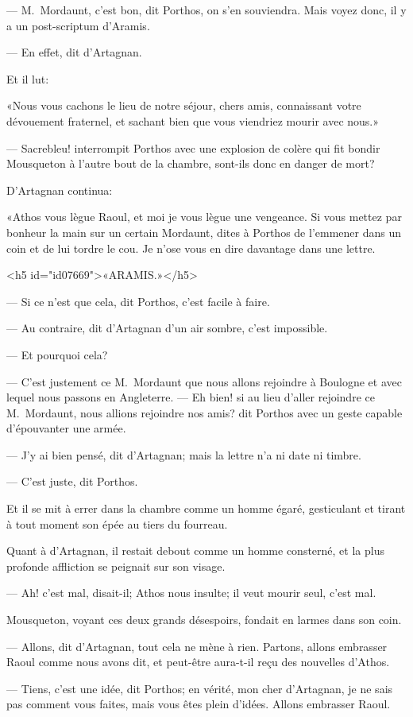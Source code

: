 — M.~Mordaunt, c'est bon, dit Porthos, on s'en souviendra. Mais voyez donc, il y a un post-scriptum d'Aramis.

— En effet, dit d'Artagnan.

Et il lut:

«Nous vous cachons le lieu de notre séjour, chers amis, connaissant votre dévouement fraternel, et sachant bien que vous viendriez mourir avec nous.»

— Sacrebleu! interrompit Porthos avec une explosion de colère qui fit bondir Mousqueton à l'autre bout de la chambre, sont-ils donc en danger de mort?

D'Artagnan continua:

«Athos vous lègue Raoul, et moi je vous lègue une vengeance. Si vous mettez par bonheur la main sur un certain Mordaunt, dites à Porthos de l'emmener dans un coin et de lui tordre le cou. Je n'ose vous en dire davantage dans une lettre.

<h5 id="id07669">«ARAMIS.»</h5>

— Si ce n'est que cela, dit Porthos, c'est facile à faire.

— Au contraire, dit d'Artagnan d'un air sombre, c'est impossible.

— Et pourquoi cela?

— C'est justement ce M.~Mordaunt que nous allons rejoindre à Boulogne et avec lequel nous passons en Angleterre.
— Eh bien! si au lieu d'aller rejoindre ce M.~Mordaunt, nous allions rejoindre nos amis? dit Porthos avec un geste capable d'épouvanter une armée.

— J'y ai bien pensé, dit d'Artagnan; mais la lettre n'a ni date ni timbre.

— C'est juste, dit Porthos.

Et il se mit à errer dans la chambre comme un homme égaré, gesticulant et tirant à tout moment son épée au tiers du fourreau.

Quant à d'Artagnan, il restait debout comme un homme consterné, et la plus profonde affliction se peignait sur son visage.

— Ah! c'est mal, disait-il; Athos nous insulte; il veut mourir seul, c'est mal.

Mousqueton, voyant ces deux grands désespoirs, fondait en larmes dans son coin.

— Allons, dit d'Artagnan, tout cela ne mène à rien. Partons, allons embrasser Raoul comme nous avons dit, et peut-être aura-t-il reçu des nouvelles d'Athos.

— Tiens, c'est une idée, dit Porthos; en vérité, mon cher d'Artagnan, je ne sais pas comment vous faites, mais vous êtes plein d'idées. Allons embrasser Raoul.

